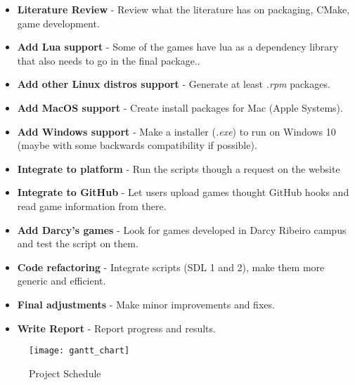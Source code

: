 \begin{itemize}
\item \textbf{Literature Review} - Review what the literature has on packaging, CMake, game development.
\item \textbf{Add Lua support} - Some of the games have lua as a dependency library that also needs to go in the final package..
\item \textbf{Add other Linux distros support} - Generate at least \textit{.rpm} packages.
\item \textbf{Add MacOS support} - Create install packages for Mac (Apple Systems).
\item \textbf{Add Windows support} - Make a installer (\textit{.exe}) to run on Windows 10 (maybe with some backwards compatibility if possible).
\item \textbf{Integrate to platform} - Run the scripts though a request on the website
\item \textbf{Integrate to GitHub} - Let users upload games thought GitHub hooks and read game information from there.
\item \textbf{Add Darcy's games} - Look for games developed in Darcy Ribeiro campus and test the script on them.
\item \textbf{Code refactoring} - Integrate scripts (SDL 1 and 2), make them more generic and efficient.
\item \textbf{Final adjustments} - Make minor improvements and fixes.
\item \textbf{Write Report} - Report progress and results.
\end{itemize}

\begin{figure}[h!]
\centering
\texttt{[image: gantt\_chart]}
\caption{Project Schedule}
\label{fig:schedule}
\end{figure}

